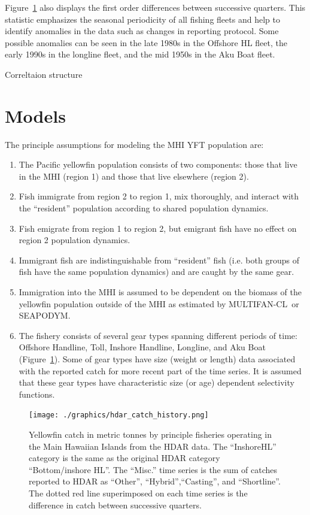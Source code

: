 \documentclass[12pt,letterpaper]{article}
\newcommand\SD{SEAPODYM}
\newcommand\MFCL{MULTIFAN-CL}
\newcommand\help[1]{\color{Magenta}{\it #1 }\normalcolor}
\begin{document}
Figure~\ref{fig:hdarTS} also displays the first order differences
between successive quarters. This statistic emphasizes the seasonal
periodicity of all fishing fleets and help to identify anomalies in
the data such as changes in reporting protocol. Some possible
anomalies can be seen in the late 1980s in the Offshore HL fleet, the
early 1990s in the longline fleet, and the mid 1950s in the Aku Boat
fleet. 
\help{The 1990s longline anomaly is expected and will be rectified
with the NMFS data become available.}

Correltaion structure

\section*{Models}
The principle assumptions for modeling the MHI YFT population are:
\begin{enumerate}
\item The Pacific yellowfin population consists of two components: those
that live in the MHI (region 1) and those that live elsewhere (region
2).
\item Fish immigrate from region 2 to region 1, mix thoroughly, and
interact with the ``resident'' population according to
shared population dynamics.
\item Fish emigrate from region 1 to region 2, but emigrant fish have
no effect on region 2 population dynamics.
\item Immigrant fish are indistinguishable from ``resident'' fish
(i.e. both groups of fish have the same population dynamics) and are
caught by the same gear.
\item Immigration into the MHI is assumed to be dependent on the
biomass of the yellowfin population outside of the MHI as estimated by
\MFCL\ or \SD.
\item The fishery consists of several gear types spanning different periods
of time: Offshore Handline, Toll, Inshore Handline, Longline, and Aku
Boat (Figure~\ref{fig:hdarTS}). Some of gear types have size
(weight or length) data associated with the reported catch for more recent
part of the time series. It is assumed that these
gear types have characteristic size (or age) dependent selectivity
functions.
\end{enumerate}

\begin{figure}
\begin{center}
\texttt{[image: ./graphics/hdar\_catch\_history.png]}
\caption{\label{fig:hdarTS}
Yellowfin catch in metric tonnes by principle fisheries operating in
the Main Hawaiian Islands from the HDAR data.
The ``InshoreHL'' category is the same as the original HDAR category
``Bottom/inshore HL''.
The ``Misc.'' time series is the sum of catches reported to HDAR as
``Other'', ``Hybrid'',``Casting'', and ``Shortline''.
The dotted red line superimposed on each time series is the difference in
catch between successive quarters.
}
\end{center}
\end{figure}
\end{document}
